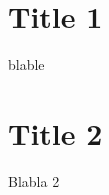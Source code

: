 \documentclass{article}
\begin{document}
  \section{Title 1}
    blable

  \section{Title 2}
    Blabla 2
\end{document}
